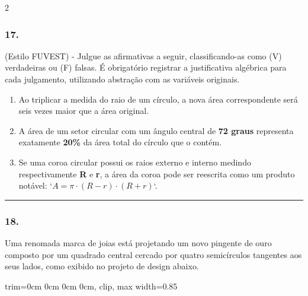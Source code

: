 \documentclass[twoside, 10pt, a4paper]{article}
\newlength{\espacoPreQuestao}\setlength{\espacoPreQuestao}{0.1cm}
\newlength{\espacoQuestao}\setlength{\espacoQuestao}{0.2cm}
\newlength{\espacoAlt}\setlength{\espacoAlt}{0.2cm}
\newcommand{\larguraTikz}{0.85\linewidth}
\begin{document}
\begin{multicols*}{2}
\subsubsection*{17.} (Estilo FUVEST) - Julgue as afirmativas a seguir, classificando-as como (V) verdadeiras ou (F) falsas. É obrigatório registrar a justificativa algébrica para cada julgamento, utilizando abstração com as variáveis originais.
\begin{enumerate}[label=\Roman*., itemsep=\espacoAlt]
\item Ao triplicar a medida do raio de um círculo, a nova área correspondente será seis vezes maior que a área original.
\item A área de um setor circular com um ângulo central de \textbf{72 graus} representa exatamente \textbf{20\%} da área total do círculo que o contém.
\item Se uma coroa circular possui os raios externo e interno medindo respectivamente \textbf{R} e \textbf{r}, a área da coroa pode ser reescrita como um produto notável: `$ A = \pi \cdot (R - r) \cdot (R + r) $`.
\end{enumerate}
\par\vspace{\espacoQuestao}

\noindent\textcolor{CorLinha}{\rule{\linewidth}{0.5pt}} 
\par\vspace{\espacoPreQuestao}
\subsubsection*{18.} Uma renomada marca de joias está projetando um novo pingente de ouro composto por um quadrado central cercado por quatro semicírculos tangentes aos seus lados, como exibido no projeto de design abaixo.
\begin{center}
\begin{adjustbox}{trim=0cm 0cm 0cm 0cm, clip, max width=\larguraTikz}
\end{adjustbox}
\end{center}
\end{multicols*}
\end{document}
